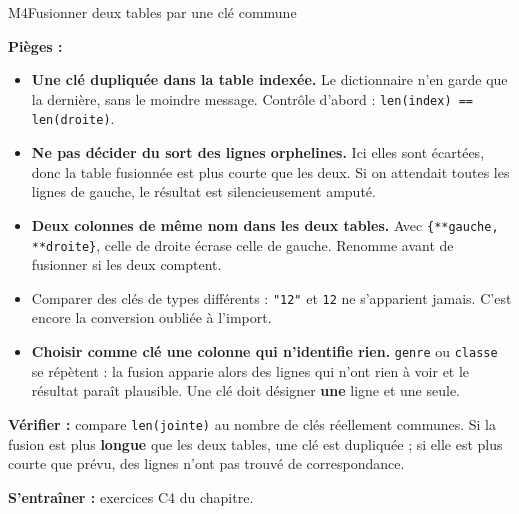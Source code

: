 \begin{fichemethode}{M4}{Fusionner deux tables par une clé commune}

\textbf{Pièges :}
\begin{itemize}
  \item \textbf{Une clé dupliquée dans la table indexée.} Le dictionnaire n'en garde que la
    dernière, sans le moindre message. Contrôle d'abord :
    \lstinline{len(index) == len(droite)}.
  \item \textbf{Ne pas décider du sort des lignes orphelines.} Ici elles sont écartées, donc
    la table fusionnée est plus courte que les deux. Si on attendait toutes les lignes de
    gauche, le résultat est silencieusement amputé.
  \item \textbf{Deux colonnes de même nom dans les deux tables.} Avec
    \lstinline!{**gauche, **droite}!, celle de droite écrase celle de gauche. Renomme avant
    de fusionner si les deux comptent.
  \item Comparer des clés de types différents : \lstinline{"12"} et \lstinline{12} ne
    s'apparient jamais. C'est encore la conversion oubliée à l'import.
  \item \textbf{Choisir comme clé une colonne qui n'identifie rien.} \lstinline{genre} ou
    \lstinline{classe} se répètent : la fusion apparie alors des lignes qui n'ont rien à voir
    et le résultat paraît plausible. Une clé doit désigner \textbf{une} ligne et une seule.
\end{itemize}

\textbf{Vérifier :} compare \lstinline{len(jointe)} au nombre de clés réellement communes.
Si la fusion est plus \textbf{longue} que les deux tables, une clé est dupliquée ; si elle
est plus courte que prévu, des lignes n'ont pas trouvé de correspondance.

\textbf{S'entraîner :} exercices C4 du chapitre.
\end{fichemethode}
